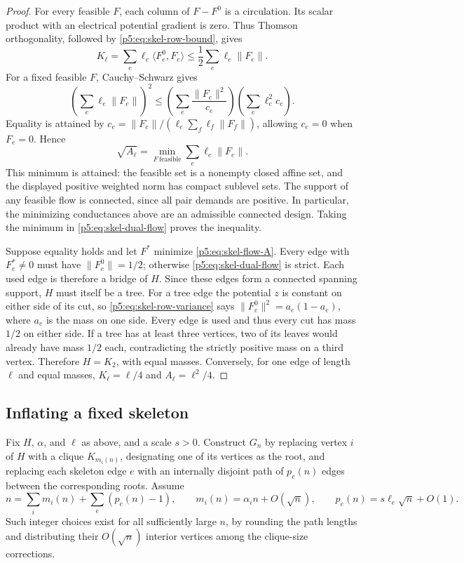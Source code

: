 \documentclass[11pt,a4paper]{article}
\theoremstyle{definition}
\theoremstyle{remark}
\numberwithin{equation}{section}
\begin{document}
\begin{proof}
For every feasible $F$, each column of $F-F^0$ is a circulation.
Its scalar product with an electrical potential gradient is zero.
Thus Thomson orthogonality, followed by \eqref{p5:eq:skel-row-bound},
gives
\begin{equation}\label{p5:eq:skel-dual-flow}
 K_\ell=\sum_e\ell_e\langle F_e^0,F_e\rangle
       \leq\frac12\sum_e\ell_e\|F_e\|.
\end{equation}
For a fixed feasible $F$, Cauchy--Schwarz gives
\[
 \left(\sum_e\ell_e\|F_e\|\right)^2
 \leq\left(\sum_e\frac{\|F_e\|^2}{c_e}\right)
       \left(\sum_e\ell_e^2c_e\right).
\]
Equality is attained by
$c_e=\|F_e\|/(\ell_e\sum_f\ell_f\|F_f\|)$, allowing $c_e=0$
when $F_e=0$.  Hence
\begin{equation}\label{p5:eq:skel-flow-A}
 \sqrt{A_\ell}
 =\min_{F\ \mathrm{feasible}}\sum_e\ell_e\|F_e\|.
\end{equation}
This minimum is attained: the feasible set is a nonempty closed
affine set, and the displayed positive weighted norm has compact
sublevel sets.  The support of any feasible flow is connected,
since all pair demands are positive.  In particular, the minimizing
conductances above are an admissible connected design.  Taking the
minimum in \eqref{p5:eq:skel-dual-flow} proves the inequality.

Suppose equality holds and let $F^*$ minimize
\eqref{p5:eq:skel-flow-A}.  Every edge with $F_e^*\ne0$ must have
$\|F_e^0\|=1/2$; otherwise \eqref{p5:eq:skel-dual-flow} is strict.
Each used edge is therefore a bridge of $H$.  Since these edges
form a connected spanning support, $H$ must itself be a tree.
For a tree edge the potential $z$ is constant on either side of
its cut, so \eqref{p5:eq:skel-row-variance} says
$\|F_e^0\|^2=a_e(1-a_e)$, where $a_e$ is the mass on one side.
Every edge is used and thus every cut has mass $1/2$ on either
side.  If a tree has at least three vertices, two of its leaves
would already have mass $1/2$ each, contradicting the strictly
positive mass on a third vertex.  Therefore $H=K_2$, with equal
masses.  Conversely, for one edge of length $\ell$ and equal
masses, $K_\ell=\ell/4$ and $A_\ell=\ell^2/4$.
\end{proof}

\subsection{Inflating a fixed skeleton}

Fix $H$, $\alpha$, and $\ell$ as above, and a scale $s>0$.
Construct $G_n$ by replacing vertex $i$ of $H$ with a clique
$K_{m_i(n)}$, designating one of its vertices as the root, and
replacing each skeleton edge $e$ with an internally disjoint path
of $p_e(n)$ edges between the corresponding roots.  Assume
\begin{equation}\label{p5:eq:skel-growth}
 n=\sum_i m_i(n)+\sum_e(p_e(n)-1),\qquad
 m_i(n)=\alpha_i n+O(\sqrt n),\qquad
 p_e(n)=s\ell_e\sqrt n+O(1).
\end{equation}
Such integer choices exist for all sufficiently large $n$, by
rounding the path lengths and distributing their $O(\sqrt n)$
interior vertices among the clique-size corrections.
\end{document}
